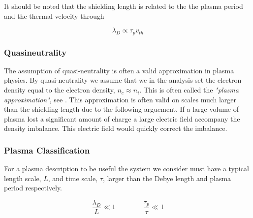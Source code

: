 		It should be noted that the shielding length is related \citep{fitzpatrick_plasma_2014} to the
		the plasma period and the thermal velocity through

		\begin{equation}
			\lambda_D \propto \tau_p v_{th}
		\end{equation}


		\subsubsection{Quasineutrality}
		The assumption of quasi-neutrality is often a valid approximation in plasma
		physics. By quasi-neutrality we assume that we in the analysis set the electron
		density equal to the electron density, \(n_e \approx n_i\). This is often called the
		\textit{"plasma approximation"}, see \citep{chen_introduction_1984}. This approximation is often valid on scales
		much larger than the shielding length due to the following arguement. If a
		large volume of plasma lost a significant amount of charge a large electric
		field accompany the density imbalance. This electric field would quickly correct
		the imbalance.

		\subsubsection{Plasma Classification}
        For a plasma description to be useful the system we consider must have
        a typical length scale, \(L\), and time scale, \(\tau\), larger than the Debye length and plasma
        period respectively.

        \[\frac{\lambda_D}{L} \ll 1  \qquad{} \qquad \frac{\tau_p}{\tau} \ll 1 \]



















